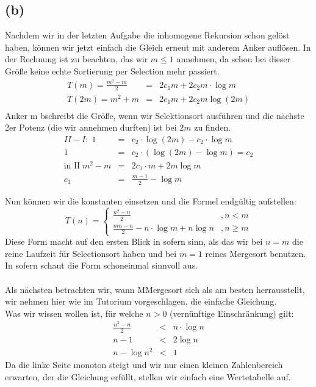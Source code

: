 \documentclass[11pt,a4paper,ngerman]{article}
\begin{document}


\subsection*{(b)}

Nachdem wir in der letzten Aufgabe die inhomogene Rekursion schon gelöst haben, können wir jetzt einfach die Gleich erneut mit anderem Anker auflösen.
In der Rechnung ist zu beachten, das wir $m \leq 1$ annehmen, da schon bei dieser Größe keine echte Sortierung per Selection mehr passiert.
$$
\begin{array}{rcl}
T(m)= \frac{m^2 - m}{2} &=&  2 c_1 m + 2 c_2 m \cdot \log m\\
T(2m) = m^2 + m &=& 2c_1 m + 2c_2 m \log (2m)\\
\end{array}
$$
Anker m bschreibt die Größe, wenn wir Selektionsort ausführen und die nächste 2er Potenz (die wir annehmen durften) ist bei $2m$ zu finden.
$$
\begin{array}{rcl}
II - I:\;1 &=& c_2 \cdot \log(2m) - c_2 \cdot \log m\\
1 &=& c_2 \cdot \left( \log (2m) - \log m\right)= c_2\\
\text{in II}\; m^2 - m &=& 2c_1 \cdot m + 2m\log m\\
c_1 &=& \frac{m-1}{2} - \log m
\end{array}
$$

Nun können wir die konstanten einsetzen und die Formel endgültig aufstellen:
$$
T(n) = \left\{ 
\begin{array}{lr}
\frac{n^2 -n}{2} &, n < m\\
\frac{mn - n}{2} - n \cdot \log m + n \log n  &, n\geq m
\end{array}
\right.
$$
Diese Form macht auf den ersten Blick in sofern sinn, als das wir bei $n = m$ die reine Laufzeit für Selectionsort haben und bei $m=1$ reines Mergesort benutzen. In sofern schaut die Form schoneinmal sinnvoll aus.\\
\vspace{\baselineskip}\\

Als nächsten betrachten wir, wann MMergesort sich als am besten herrausstellt, wir nehmen hier wie im Tutorium vorgeschlagen, die einfache Gleichung.\\
Was wir wissen wollen ist, für welche $n>0$ (vernünftige Einschränkung) gilt:\\
$$
\begin{array}{rcl}
\frac{n^2 - n}{2} &<& n \cdot \log n\\
n-1 &<& 2\log n\\
n - \log n^2 &<& 1
\end{array}
$$
Da die linke Seite monoton steigt und wir nur einen kleinen Zahlenbereich erwarten, der die Gleichung erfüllt, stellen wir einfach eine Wertetabelle auf.\\
\end{document}
